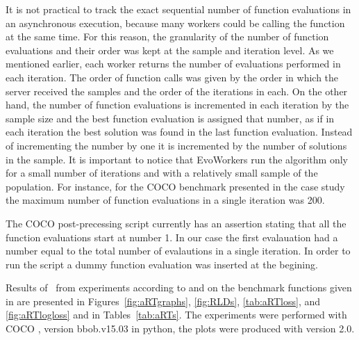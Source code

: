 \documentclass[sigconf]{acmart}
\begin{document}
It is not practical to track the exact sequential 
number of function evaluations in an asynchronous 
execution, because many workers could be calling 
the function at the same time. For this reason, the 
granularity of the number of function evaluations and 
their order was kept at the sample and iteration level. 
As we mentioned earlier, each worker returns the number 
of evaluations performed in each iteration. The order 
of function calls was given by the order in which the 
server received the samples and the order of the 
iterations in each. On the other hand, the number of 
function evaluations is incremented in each iteration 
by the sample size and the best function evaluation is 
assigned that number,  as if in each iteration the best 
solution was found in the last function evaluation. Instead 
of incrementing the number by one it is incremented by the 
number of solutions in the sample. 
It is important to notice that EvoWorkers run the algorithm 
only for a small number of iterations and with 
a relatively small sample of the population. For instance,
for the COCO benchmark presented in the case study the maximum number of 
function evaluations in a single iteration was 200.

The COCO post-precessing script currently has an assertion stating
that all the function evaluations start at number 1. In our
case the first evalauation had a number equal to the total number
of evalautions in a single iteration. In order to run the script 
a dummy function evaluation was inserted at the begining. 

Results of \algname\ from experiments according to \cite{hansen2016exp} and \cite{hansen2016perfass} on the benchmark
functions given in \cite{wp200901_2010,hansen2012fun} are presented in
Figures~\ref{fig:aRTgraphs}, \ref{fig:RLDs}, \ref{tab:aRTloss}, and \ref{fig:aRTlogloss} and in
Tables~\ref{tab:aRTs}. The experiments were performed with COCO \cite{hansen2016cocoplat}, version bbob.v15.03 in
python, the plots were produced with version 2.0.



\end{document}
